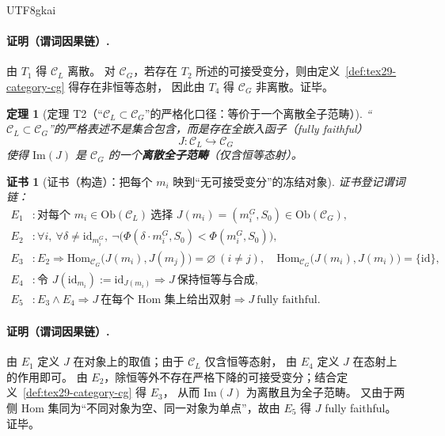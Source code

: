 \documentclass[12pt]{article}
\newtheorem{theorem}{定理}[section]
\newtheorem{Certificate}{证书}[section]
\begin{document}
\begin{CJK*}{UTF8}{gkai}
\paragraph{证明（谓词因果链）.}
由 $T_1$ 得 $\mathcal{C}_L$ 离散。
对 $\mathcal{C}_G$，若存在 $T_2$ 所述的可接受变分，则由定义~\ref{def:tex29-category-cg} 得存在非恒等态射，
因此由 $T_4$ 得 $\mathcal{C}_G$ 非离散。证毕。

\begin{theorem}[定理 T2（“$\mathcal{C}_L\subset \mathcal{C}_G$”的严格化口径：等价于一个离散全子范畴）]
\label{thm:tex29-category-fully-faithful-embed}
“$\mathcal{C}_L\subset \mathcal{C}_G$”的严格表述不是集合包含，而是存在全嵌入函子（fully faithful）
\[
  J:\mathcal{C}_L\hookrightarrow \mathcal{C}_G
\]
使得 $\mathrm{Im}(J)$ 是 $\mathcal{C}_G$ 的一个\textbf{离散全子范畴}（仅含恒等态射）。
\end{theorem}

\begin{Certificate}[证书（构造）：把每个 $m_i$ 映到“无可接受变分”的冻结对象]
\label{cert:tex29-category-fully-faithful-embed}
证书登记谓词链：
\[
\begin{aligned}
  E_1 &: \text{对每个 }m_i\in\mathrm{Ob}(\mathcal{C}_L)\ \text{选择 }J(m_i)=(m_i^G,S_0)\in\mathrm{Ob}(\mathcal{C}_G),\\
  E_2 &: \forall i,\ \forall \delta\neq \mathrm{id}_{m_i^G},\ \neg\bigl(\Phi(\delta\cdot m_i^G,S_0)<\Phi(m_i^G,S_0)\bigr)
    ,\\
  E_3 &: E_2\Rightarrow \mathrm{Hom}_{\mathcal{C}_G}\bigl(J(m_i),J(m_j)\bigr)=\varnothing\ (i\neq j),\quad
        \mathrm{Hom}_{\mathcal{C}_G}\bigl(J(m_i),J(m_i)\bigr)=\{\mathrm{id}\},\\
  E_4 &: \text{令 }J(\mathrm{id}_{m_i}):=\mathrm{id}_{J(m_i)}\Rightarrow J\ \text{保持恒等与合成},\\
  E_5 &: E_3\wedge E_4\Rightarrow J\ \text{在每个 Hom 集上给出双射}\Rightarrow J\ \text{fully faithful}.
\end{aligned}
\]
\end{Certificate}

\paragraph{证明（谓词因果链）.}
由 $E_1$ 定义 $J$ 在对象上的取值；由于 $\mathcal{C}_L$ 仅含恒等态射，
由 $E_4$ 定义 $J$ 在态射上的作用即可。
由 $E_2$，除恒等外不存在严格下降的可接受变分；结合定义~\ref{def:tex29-category-cg} 得 $E_3$，
从而 $\mathrm{Im}(J)$ 为离散且为全子范畴。
又由于两侧 Hom 集同为“不同对象为空、同一对象为单点”，故由 $E_5$ 得 $J$ fully faithful。证毕。


\end{CJK*}
\end{document}
